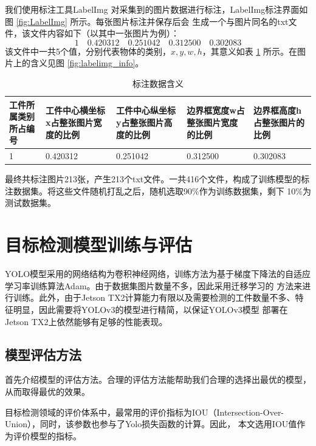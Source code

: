 我们使用标注工具LabelImg \cite{LabelImg} 对采集到的图片数据进行标注，LabelImg标注界面如图 \ref{fig:LabelImg} 所示。每张图片标注并保存后会
生成一个与图片同名的txt文件，该文件内容如下（以其中一张图片为例）：
$$1 \quad 0.420312 \quad 0.251042 \quad 0.312500 \quad 0.302083$$
该文件中一共5个值，分别代表物体的类别，$x , y , w , h$，其意义如表 \ref{table:LabelImg:info} 所示。在图片上的含义见图 \ref{fig:labelimg_info}。
{
    \begin{table}[htb]
        \caption{标注数据含义}
        \label{table:LabelImg:info}
        \centering
        \begin{tabular}[t]{p{} | p{} | p{} | p{} | p{}}
            \hline
            工件所属类别所占编号 & 工件中心横坐标x占整张图片宽度的比例 & 工件中心纵坐标y占整张图片高度的比例 & 边界框宽度w占整张图片宽度的比例 & 边界框高度h占整张图片的比例 \\
            \hline
            1 & 0.420312 & 0.251042 & 0.312500 & 0.302083\\
            \hline
        \end{tabular}
    \end{table}
}

最终共标注图片213张，产生213个txt文件。一共416个文件，构成了训练模型的标注数据集。将这些文件随机打乱之后，随机选取90\%作为训练数据集，剩下
10\%为测试数据集。

\section{目标检测模型训练与评估}
YOLO模型采用的网络结构为卷积神经网络，训练方法为基于梯度下降法的自适应学习率训练算法Adam。由于数据集图片数量不多，因此采用迁移学习的
方法来进行训练。此外，由于Jetson TX2计算能力有限以及需要检测的工件数量不多、特征明显，因此需要将YOLOv3的模型进行精简，以保证YOLOv3模型
部署在Jetson TX2上依然能够有足够的性能表现。

\subsection{模型评估方法}

首先介绍模型的评估方法。合理的评估方法能帮助我们合理的选择出最优的模型，从而取得最优的效果。

目标检测领域的评价体系中，最常用的评价指标为IOU（Intersection-Over-Union），同时，该参数也参与了Yolo损失函数的计算。因此，
本文选用IOU值作为评价模型的指标。

